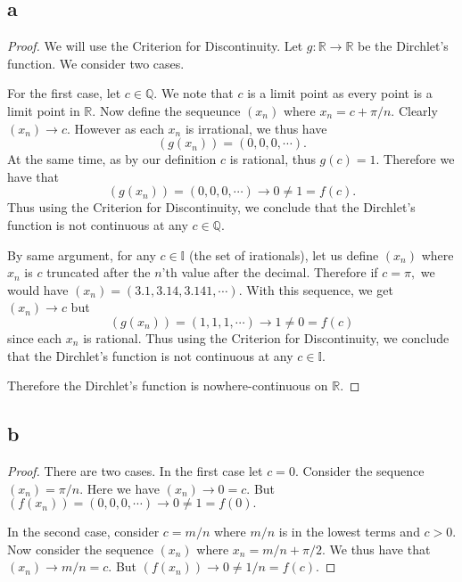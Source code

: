 \documentclass[10pt]{article}
\begin{document}
\subsection*{a}

\begin{proof}
    We will use the Criterion for Discontinuity. Let $g:\mathbb{R}\to\mathbb{R}$ be the Dirchlet's function. We consider two cases. 
    
    For the first case, let $c\in\mathbb{Q}.$ We note that $c$ is a limit point as every point is a limit point in $\mathbb{R}.$ Now define the sequeunce $(x_n)$ where $x_n = c + \pi/n.$ Clearly $(x_n)\to c.$ However as each $x_n$ is irrational, we thus have
    \begin{equation*}
        (g(x_n)) = (0,0,0,\cdots).
    \end{equation*}
    At the same time, as by our definition $c$ is rational, thus $g(c)=1$.
    Therefore we have that
    \begin{equation*}
        (g(x_n)) = (0,0,0,\cdots)\to 0 \neq 1 = f(c).
    \end{equation*} 
    Thus using the Criterion for Discontinuity, we conclude that the Dirchlet's function is not continuous at any $c\in\mathbb{Q}.$

    By same argument, for any $c\in\mathbb{I}$ (the set of irationals), let us define $(x_n)$ where $x_n$ is $c$ truncated after the $n$'th value after the decimal. Therefore if $c=\pi,$ we would have $(x_n)=(3.1,3.14,3.141,\cdots).$
    With this sequence, we get $(x_n)\to c$ but
    \begin{equation*}
        (g(x_n)) = (1,1,1,\cdots)\to 1 \neq 0 = f(c)
    \end{equation*}
    since each $x_n$ is rational. Thus using the Criterion for Discontinuity, we conclude that the Dirchlet's function is not continuous at any $c\in\mathbb{I}.$

    Therefore the Dirchlet's function is nowhere-continuous on $\mathbb{R}.$
\end{proof}

\subsection*{b}

\begin{proof}
    There are two cases. In the first case let $c = 0.$ Consider the sequence $(x_n)=\pi/n.$ Here we have $(x_n)\to 0 = c.$ But $(f(x_n))=(0,0,0,\cdots)\to 0 \neq 1 = f(0).$

    In the second case, consider $c=m/n$ where $m/n$ is in the lowest terms and $c>0.$ Now consider the sequence $(x_n)$ where $x_n = m/n + \pi/2.$ We thus have that $(x_n)\to m/n = c.$ But $(f(x_n))\to 0 \neq 1/n = f(c).$
\end{proof}
\end{document}
